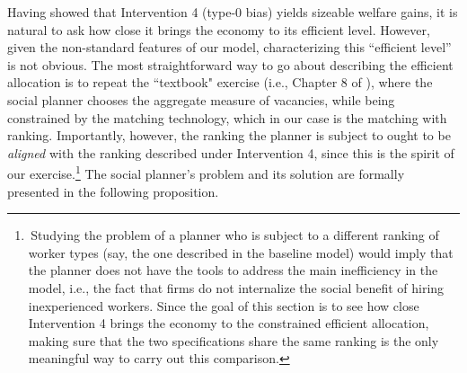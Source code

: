 \documentclass[12pt]{article} %
\theoremstyle{definition}
\begin{document}
Having showed that Intervention 4 (type-0 bias) yields sizeable welfare gains, it is natural to ask how close it brings the economy to its efficient level.
However, given the non-standard features of our model, characterizing this ``efficient level'' is not obvious.
The most straightforward way to go about describing the efficient allocation is to repeat the ``textbook" exercise (i.e., Chapter 8 of \citealt{pissarides2000equilibrium}), where the social planner chooses the aggregate measure of vacancies, while being constrained by the matching technology, which in our case is the \cite{petrongolo2001looking} matching with ranking. Importantly, however, the ranking the planner is subject to ought to be \textit{aligned} with the ranking described under Intervention 4, since this is the spirit of our exercise.\footnote{\,Studying the problem of a planner who is subject to a different ranking of worker types (say, the one described in the baseline model) would imply that the planner does not have the tools to address the main inefficiency in the model, i.e., the fact that firms do not internalize the social benefit of hiring inexperienced workers. Since the goal of this section is to see how close Intervention 4 brings the economy to the constrained efficient allocation, making sure that the two specifications share the same ranking is the only meaningful way to carry out this comparison.} The social planner's problem and its solution are formally presented in the following proposition. 
\end{document}
